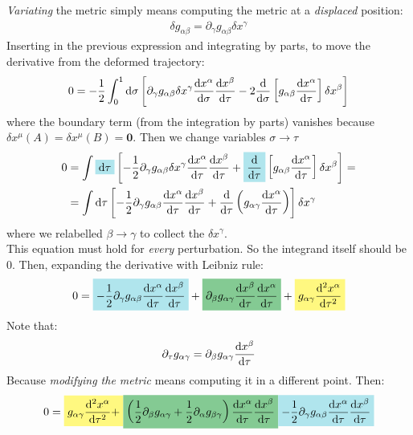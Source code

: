 \documentclass[../template.tex]{subfiles}
\begin{document}
\textit{Variating} the metric simply means computing the metric at a \textit{displaced} position:
\begin{align*}
    \delta g_{\alpha \beta} = \partial_\gamma g_{\alpha \beta} \delta x^\gamma 
\end{align*}  
Inserting in the previous expression and integrating by parts, to move the derivative from the deformed trajectory:
\begin{align*}
    0 = -\frac{1}{2} \int_0^1 \dd{\sigma} \left[\partial_\gamma g_{\alpha \beta} \delta x^\gamma \dv{x^\alpha}{\sigma} \dv{x^\beta}{\tau} - 2 \dv{\sigma} \left[g_{\alpha \beta } \dv{x^\alpha}{\tau}\right] \delta x^\beta\right] 
\end{align*}
where the boundary term (from the integration by parts) vanishes because $\delta x^\mu(A) = \delta x^\mu (B) = \bm{0}$. Then we change variables $\sigma \to \tau $ 
\begin{align*}
    0 &= \int \hlc{SkyBlue}{\dd{\tau}} \left[-\frac{1}{2} \partial_\gamma g_{\alpha \beta} \delta x^\gamma \dv{x^\alpha}{\tau}\dv{x^\beta}{\tau} + \hlc{SkyBlue}{\dv{\tau}} \left[g_{\alpha \beta} \dv{x^\alpha}{\tau}\right] \delta x^\beta \right] =\\
    &= \int \dd{\tau} \left[-\frac{1}{2} \partial_\gamma g_{\alpha \beta } \dv{x^\alpha}{\tau} \dv{x^\beta}{\tau} + \dv{\tau}\left(g_{\alpha \gamma} \dv{x^\alpha}{\tau}\right)\right] \delta x^\gamma
\end{align*}
where we relabelled $\beta \to \gamma$ to collect the $\delta x^\gamma$.\\
This equation must hold for \textit{every} perturbation. So the integrand itself should be $0$. Then, expanding the derivative with Leibniz rule:
\begin{align*}
    0 =\hlc{SkyBlue}{ -\frac{1}{2} \partial_\gamma g_{\alpha \beta} \dv{x^\alpha}{\tau} \dv{x^\beta}{\tau}} + \hlc{ForestGreen}{\partial_\beta g_{\alpha \gamma} \dv{x^\beta}{\tau} \dv{x^\alpha}{\tau}} + \hlc{Yellow}{g_{\alpha \gamma} \dv[2]{x^\alpha}{\tau} }  
\end{align*}
Note that:
\begin{align*}
    \partial_\tau g_{\alpha \gamma} = \partial_\beta g_{\alpha \gamma } \dv{x^\beta}{\tau}
\end{align*}
Because \textit{modifying the metric} means computing it in a different point. Then:
\begin{align*}
    0 = \hlc{Yellow}{g_{\alpha \gamma} \dv[2]{x^\alpha}{\tau} +} \hlc{ForestGreen}{\left(\frac{1}{2} \partial_\beta g_{\alpha \gamma} + \frac{1}{2}  \partial_\alpha g_{\beta \gamma}  \right) \dv{x^\alpha}{\tau} \dv{x^\beta}{\tau}} \hlc{SkyBlue}{- \frac{1}{2}\partial_\gamma g_{\alpha \beta}  \dv{x^\alpha}{\tau}\dv{x^\beta}{\tau}}
\end{align*} 
\end{document}
